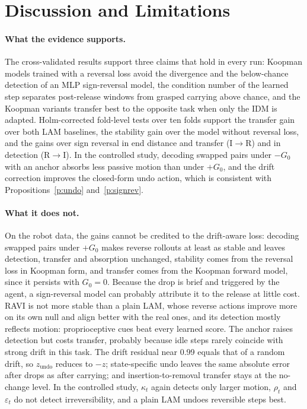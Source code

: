 \documentclass{jcse}
\newcommand{\method}{RAVI}
\newcommand{\zundo}{z_{\mathrm{undo}}}
\begin{document}
\section{Discussion and Limitations} \label{s:discussion}

\paragraph{What the evidence supports.}
The cross-validated results support three claims that hold in every run: Koopman models trained with a reversal loss avoid the divergence and the below-chance detection of an MLP sign-reversal model, the condition number of the learned step separates post-release windows from grasped carrying above chance, and the Koopman variants transfer best to the opposite task when only the IDM is adapted. Holm-corrected fold-level tests over ten folds support the transfer gain over both LAM baselines, the stability gain over the model without reversal loss, and the gains over sign reversal in end distance and transfer (I$\to$R) and in detection (R$\to$I).
In the controlled study, decoding swapped pairs under $-G_0$ with an anchor absorbs less passive motion than under $+G_0$, and the drift correction improves the closed-form undo action, which is consistent with Propositions~\ref{p:undo} and~\ref{p:signrev}.

\paragraph{What it does not.}
On the robot data, the gains cannot be credited to the drift-aware loss: decoding swapped pairs under $+G_0$ makes reverse rollouts at least as stable and leaves detection, transfer and absorption unchanged, stability comes from the reversal loss in Koopman form, and transfer comes from the Koopman forward model, since it persists with $G_0=0$.
Because the drop is brief and triggered by the agent, a sign-reversal model can probably attribute it to the release at little cost.
{\method} is not more stable than a plain LAM, whose reverse actions improve more on its own null and align better with the real ones, and its detection mostly reflects motion: proprioceptive cues beat every learned score. The anchor raises detection but costs transfer, probably because idle steps rarely coincide with strong drift in this task.
The drift residual near 0.99 equals that of a random drift, so $\zundo$ reduces to $-z$; state-specific undo leaves the same absolute error after drops as after carrying; and insertion-to-removal transfer stays at the no-change level.
In the controlled study, $\kappa_t$ again detects only larger motion, $\rho_t$ and $\varepsilon_t$ do not detect irreversibility, and a plain LAM undoes reversible steps best.
\end{document}
